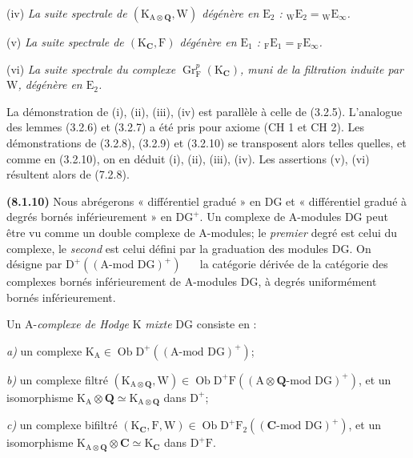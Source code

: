\documentclass[11pt,leqno]{article}
\newcommand{\Page}[1]{\ifvmode\noindent\else\unskip\ \fi{\footnotesize\textcolor{gray}{[p.\,#1]}}\ \ignorespaces}
\begin{document}
(iv) \textit{La suite spectrale de \((\mathrm{K}_{\mathrm{A}\otimes\mathbf{Q}},\mathrm{W})\) dégénère en \(\mathrm{E}_{2}\) : \({}_{\mathrm{W}}\mathrm{E}_{2}={}_{\mathrm{W}}\mathrm{E}_{\infty}\).}

(v) \textit{La suite spectrale de \((\mathrm{K}_{\mathbf{C}},\mathrm{F})\) dégénère en \(\mathrm{E}_{1}\) : \({}_{\mathrm{F}}\mathrm{E}_{1}={}_{\mathrm{F}}\mathrm{E}_{\infty}\).}

(vi) \textit{La suite spectrale du complexe \(\operatorname{Gr}_{\mathrm{F}}^{p}(\mathrm{K}_{\mathbf{C}})\), muni de la filtration induite par \(\mathrm{W}\), dégénère en \(\mathrm{E}_{2}\).}

La démonstration de (i), (ii), (iii), (iv) est parallèle à celle de (3.2.5). L’analogue des lemmes (3.2.6) et (3.2.7) a été pris pour axiome (CH 1 et CH 2). Les démonstrations de (3.2.8), (3.2.9) et (3.2.10) se transposent alors telles quelles, et comme en (3.2.10), on en déduit (i), (ii), (iii), (iv). Les assertions (v), (vi) résultent alors de (7.2.8).

\textbf{(8.1.10)} Nous abrégerons « différentiel gradué » en \(\mathrm{DG}\) et « différentiel gradué à degrés bornés inférieurement » en \(\mathrm{DG}^{+}\). Un complexe de \(\mathrm{A}\)-modules \(\mathrm{DG}\) peut être vu comme un double complexe de \(\mathrm{A}\)-modules; le \textit{premier} degré est celui du complexe, le \textit{second} est celui défini par la graduation des modules \(\mathrm{DG}\). On désigne par \(\mathrm{D}^{+}((\mathrm{A}\text{-mod }\mathrm{DG})^{+})\)
\Page{31}
la catégorie dérivée de la catégorie des complexes bornés inférieurement de \(\mathrm{A}\)-modules \(\mathrm{DG}\), à degrés uniformément bornés inférieurement.

Un \(\mathrm{A}\)-\textit{complexe de Hodge} \(\mathrm{K}\) \textit{mixte} \(\mathrm{DG}\) consiste en :

\textit{a)} un complexe \(\mathrm{K}_{\mathrm{A}}\in\operatorname{Ob}\mathrm{D}^{+}((\mathrm{A}\text{-mod }\mathrm{DG})^{+})\);

\textit{b)} un complexe filtré \((\mathrm{K}_{\mathrm{A}\otimes\mathbf{Q}},\mathrm{W})\in\operatorname{Ob}\mathrm{D}^{+}\mathrm{F}((\mathrm{A}\otimes\mathbf{Q}\text{-mod }\mathrm{DG})^{+})\), et un isomorphisme \(\mathrm{K}_{\mathrm{A}}\otimes\mathbf{Q}\simeq\mathrm{K}_{\mathrm{A}\otimes\mathbf{Q}}\) dans \(\mathrm{D}^{+}\);

\textit{c)} un complexe bifiltré \((\mathrm{K}_{\mathbf{C}},\mathrm{F},\mathrm{W})\in\operatorname{Ob}\mathrm{D}^{+}\mathrm{F}_{2}((\mathbf{C}\text{-mod }\mathrm{DG})^{+})\), et un isomorphisme \(\mathrm{K}_{\mathrm{A}\otimes\mathbf{Q}}\otimes\mathbf{C}\simeq\mathrm{K}_{\mathbf{C}}\) dans \(\mathrm{D}^{+}\mathrm{F}\).
\end{document}
